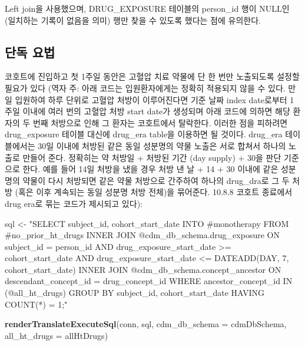 \documentclass[10.5pt]{book}
\newenvironment{Shaded}{\begin{snugshade}}{\end{snugshade}}
\newcommand{\KeywordTok}[1]{\textcolor[rgb]{0.13,0.29,0.53}{\textbf{#1}}}
\newcommand{\DataTypeTok}[1]{\textcolor[rgb]{0.13,0.29,0.53}{#1}}
\newcommand{\StringTok}[1]{\textcolor[rgb]{0.31,0.60,0.02}{#1}}
\newcommand{\NormalTok}[1]{#1}
\theoremstyle{definition}
\theoremstyle{definition}
\theoremstyle{definition}
\theoremstyle{remark}
\begin{document}
Left join을 사용했으며, DRUG\_EXPOSURE 테이블의 person\_id 행이 NULL인
(일치하는 기록이 없음을 의미) 행만 찾을 수 있도록 했다는 점에 유의한다.

\subsection{단독 요법}\label{-}

코호트에 진입하고 첫 1주일 동안은 고혈압 치료 약물에 단 한 번만
노출되도록 설정할 필요가 있다 (역자 주: 아래 코드는 입원환자에게는
정확히 적용되지 않을 수 있다. 만일 입원하여 하루 단위로 고혈압 처방이
이루어진다면 기준 날짜 index date로부터 1주일 이내에 여러 번의 고혈압
처방 start date가 생성되며 아래 코드에 의하면 해당 환자의 두 번째
처방으로 인해 그 환자는 코호트에서 탈락한다. 이러한 점을 피하려면
drug\_exposure 테이블 대신에 drug\_era table을 이용하면 될 것이다.
drug\_era 테이블에서는 30일 이내에 처방된 같은 동일 성분명의 약물 노출은
서로 합쳐서 하나의 노출로 만들어 준다. 정확히는 약 처방일 + 처방된 기간
(day supply) + 30을 판단 기준으로 한다. 예를 들어 14일 처방을 냈을 경우
처방 낸 날 + 14 + 30 이내에 같은 성분명의 약물이 다시 처방되면 같은 약물
처방으로 간주하여 하나의 drug\_dra로 그 두 처방 (혹은 이후 계속되는 동일
성분명 처방 전체)을 묶어준다. 10.8.8 코호트 종료에서 drug era로 묶는
코드가 제시되고 있다):

\begin{Shaded}
\begin{Highlighting}[]
\NormalTok{sql <-}\StringTok{ "SELECT subject_id,}
\StringTok{  cohort_start_date}
\StringTok{INTO #monotherapy}
\StringTok{FROM #no_prior_ht_drugs}
\StringTok{INNER JOIN @cdm_db_schema.drug_exposure}
\StringTok{  ON subject_id = person_id}
\StringTok{    AND drug_exposure_start_date >= cohort_start_date}
\StringTok{    AND drug_exposure_start_date <= DATEADD(DAY, 7, cohort_start_date)}
\StringTok{INNER JOIN @cdm_db_schema.concept_ancestor}
\StringTok{  ON descendant_concept_id = drug_concept_id}
\StringTok{WHERE ancestor_concept_id IN (@all_ht_drugs)}
\StringTok{GROUP BY subject_id,}
\StringTok{  cohort_start_date}
\StringTok{HAVING COUNT(*) = 1;"}

\KeywordTok{renderTranslateExecuteSql}\NormalTok{(conn,}
\NormalTok{                          sql,}
                          \DataTypeTok{cdm_db_schema =}\NormalTok{ cdmDbSchema,}
                          \DataTypeTok{all_ht_drugs =}\NormalTok{ allHtDrugs)}
\end{Highlighting}
\end{Shaded}
\end{document}
